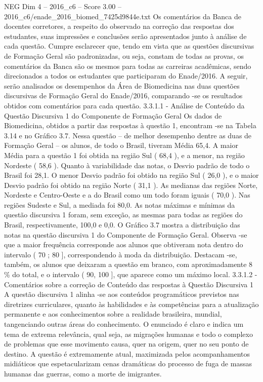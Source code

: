 \begin{textsample}{NEG Dim 4 – 2016\_c6 – Score 3.00 – 2016\_c6/enade\_2016\_biomed\_7425d9844e.txt}
Os comentários da Banca de docentes corretores, a respeito do observado na correção das respostas dos estudantes, suas impressões e conclusões serão apresentados junto à análise de cada questão.
Cumpre esclarecer que, tendo em vista que as questões discursivas de Formação Geral são padronizadas, ou seja, constam de todas as provas, os comentários da Banca são os mesmos para todas as carreiras acadêmicas, sendo direcionados a todos os estudantes que participaram do Enade/2016.
A seguir, serão analisados os desempenhos da Área de Biomedicina nas duas questões discursivas de Formação Geral do Enade/2016, comparando -se os resultados obtidos com comentários para cada questão. 3.3.1.1 - Análise de Conteúdo da Questão Discursiva 1 do Componente de Formação Geral Os dados de Biomedicina, obtidos a partir das respostas à questão 1, encontram -se na Tabela 3.14 e no Gráfico 3.7.
Nessa questão – de melhor desempenho dentre as duas de Formação Geral – os alunos, de todo o Brasil, tiveram Média 65,4.
A maior Média para a questão 1 foi obtida na região Sul ( 68,4 ), e a menor, na região Nordeste ( 58,6 ).
Quanto à variabilidade das notas, o Desvio padrão de todo o Brasil foi 28,1.
O menor Desvio padrão foi obtido na região Sul ( 26,0 ), e o maior Desvio padrão foi obtido na região Norte ( 31,1 ).
As medianas das regiões Norte, Nordeste e Centro-Oeste e a do Brasil como um todo foram iguais ( 70,0 ).
Nas regiões Sudeste e Sul, a mediada foi 80,0.
As notas máximas e mínimas da questão discursiva 1 foram, sem exceção, as mesmas para todas as regiões do Brasil, respectivamente, 100,0 e 0,0.
O Gráfico 3.7 mostra a distribuição das notas na questão discursiva 1 do Componente de Formação Geral.
Observa -se que a maior frequência corresponde aos alunos que obtiveram nota dentro do intervalo ( 70 ; 80 ], correspondendo à moda da distribuição.
Destacam -se, também, os alunos que deixaram a questão em branco, com aproximadamente 8 \% do total, e o intervalo ( 90, 100 ], que aparece como um máximo local. 3.3.1.2 - Comentários sobre a correção de Conteúdo das respostas à Questão Discursiva 1 A questão discursiva 1 alinha -se aos conteúdos programáticos previstos nas diretrizes curriculares, quanto às habilidades e às competências para a atualização permanente e aos conhecimentos sobre a realidade brasileira, mundial, tangenciando outras áreas do conhecimento.
O enunciado é claro e indica um tema de extrema relevância, qual seja, as migrações humanas e todo o complexo de problemas que esse movimento causa, quer na origem, quer no seu ponto de destino.
A questão é extremamente atual, maximizada pelos acompanhamentos midiáticos que espetacularizam cenas dramáticas do processo de fuga de massas humanas das guerras, como a morte de imigrantes.

\end{textsample}
